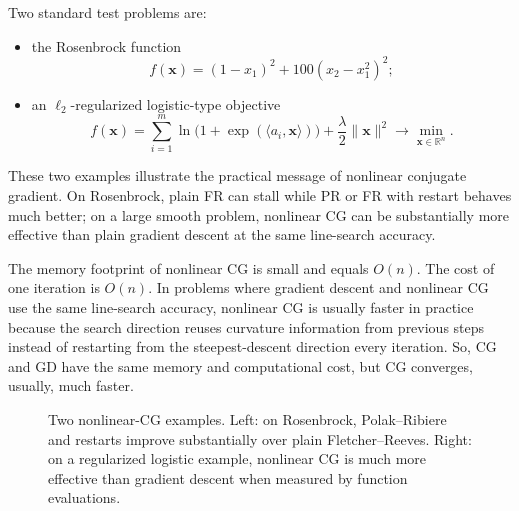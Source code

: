 \begin{example}
Two standard test problems are:
\begin{itemize}
  \item the Rosenbrock function
  \[
    f(\mathbf{x})=(1-x_1)^2+100(x_2-x_1^2)^2;
  \]
  \item an $\ell_2$-regularized logistic-type objective
  \[
    f(\mathbf{x})
    =\sum_{i=1}^m \ln\bigl(1+\exp(\langle a_i,\mathbf{x}\rangle)\bigr)
    +\frac{\lambda}{2}\|\mathbf{x}\|^2
    \to \min_{\mathbf{x}\in\mathbb{R}^n}.
  \]
\end{itemize}
These two examples illustrate the practical message of nonlinear conjugate
gradient. On
Rosenbrock, plain FR can stall while PR or FR with restart behaves much better;
on a large smooth problem, nonlinear CG can be substantially more effective
than plain gradient descent at the same line-search accuracy.
\end{example}

The memory footprint of nonlinear CG is small and equals $O(n)$. The cost of one
iteration is $O(n)$. In
problems where gradient descent and nonlinear CG use the same line-search
accuracy, nonlinear CG is usually faster in practice because the search
direction reuses curvature information from previous steps instead of restarting
from the steepest-descent direction every iteration. So, CG and GD have the same memory
and computational cost, but CG converges, usually, much faster.

\begin{figure}[ht]
  \centering
  \caption{Two nonlinear-CG examples. Left: on Rosenbrock,
  Polak--Ribiere and restarts improve substantially over plain
  Fletcher--Reeves. Right: on a regularized logistic example, nonlinear CG is
  much more effective than gradient descent when measured by function
  evaluations.}
  \label{fig:ch5-nonlinear-cg-comparison}
\end{figure}
